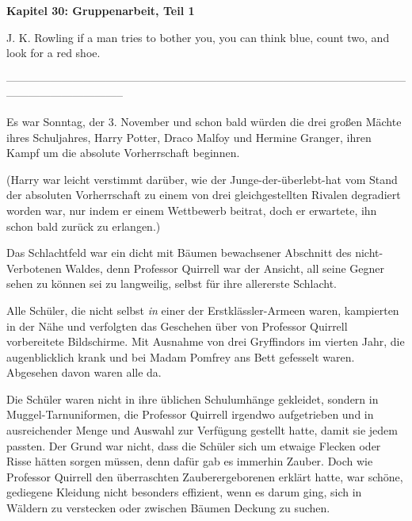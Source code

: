 

\hypertarget{gruppenarbeit-teil-1}{%

\textbf{Kapitel 30: Gruppenarbeit, Teil 1\\ }

J. K. Rowling if a man tries to bother you, you can think blue, count two, and look for a red shoe.

--------------------------------------------------------------------------------------------------------------------------------------------

Es war Sonntag, der 3. November und schon bald würden die drei großen Mächte ihres Schuljahres, Harry Potter, Draco Malfoy und Hermine Granger, ihren Kampf um die absolute Vorherrschaft beginnen.

(Harry war leicht verstimmt darüber, wie der Junge-der-überlebt-hat vom Stand der absoluten Vorherrschaft zu einem von drei gleichgestellten Rivalen degradiert worden war, nur indem er einem Wettbewerb beitrat, doch er erwartete, ihn schon bald zurück zu erlangen.)

Das Schlachtfeld war ein dicht mit Bäumen bewachsener Abschnitt des nicht-Verbotenen Waldes, denn Professor Quirrell war der Ansicht, all seine Gegner sehen zu können sei zu langweilig, selbst für ihre allererste Schlacht.

Alle Schüler, die nicht selbst \emph{in} einer der Erstklässler-Armeen waren, kampierten in der Nähe und verfolgten das Geschehen über von Professor Quirrell vorbereitete Bildschirme. Mit Ausnahme von drei Gryffindors im vierten Jahr, die augenblicklich krank und bei Madam Pomfrey ans Bett gefesselt waren. Abgesehen davon waren alle da.

Die Schüler waren nicht in ihre üblichen Schulumhänge gekleidet, sondern in Muggel-Tarnuniformen, die Professor Quirrell irgendwo aufgetrieben und in ausreichender Menge und Auswahl zur Verfügung gestellt hatte, damit sie jedem passten. Der Grund war nicht, dass die Schüler sich um etwaige Flecken oder Risse hätten sorgen müssen, denn dafür gab es immerhin Zauber. Doch wie Professor Quirrell den überraschten Zauberergeborenen erklärt hatte, war schöne, gediegene Kleidung nicht besonders effizient, wenn es darum ging, sich in Wäldern zu verstecken oder zwischen Bäumen Deckung zu suchen.

}
